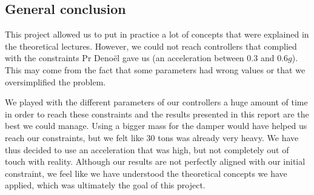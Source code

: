 \subsection{General conclusion}
This project allowed us to put in practice a lot of concepts that were explained in the theoretical lectures. However, we could not reach controllers that complied with the constraints Pr Denoël gave us (an acceleration between $0.3$ and $0.6g$). This may come from the fact that some parameters had wrong values or that we oversimplified the problem.\par
We played with the different parameters of our controllers a huge amount of time in order to reach these constraints and the results presented in this report are the best we could manage. Using a bigger mass for the damper would have helped us reach our constraints, but we felt like $30$ tons was already very heavy. We have thus decided to use an acceleration that was high, but not completely out of touch with reality. Although our results are not perfectly aligned with our initial constraint, we feel like we have understood the theoretical concepts we have applied, which was ultimately the goal of this project.

